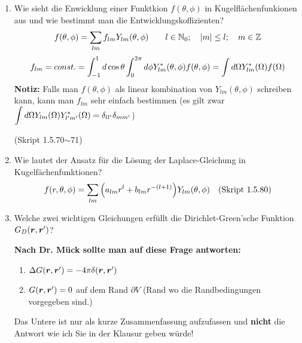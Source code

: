\begin{enumerate}
  \item Wie sieht die Enwicklung einer Funktkion $f(\theta,\phi)$ in %
        Kugelflächenfunkionen aus und wie bestimmt man die 
        Entwicklungskoffizienten?
        $$\displaystyle f(\theta, \phi)=\sum_{lm} f_{lm}Y_{lm}(\theta,\phi)
        \qquad l\in \mathbb{N}_0;\quad \abs{m}\le l; 
        \quad m\in\mathbb{Z}$$
        $$\displaystyle f_{lm}=const.
         =\int_{-1}^{1} d\cos\theta\int_0^{2\pi}d\phi 
         Y^*_{lm}(\theta,\phi)f(\theta,\phi)
         =\int d\Omega Y^*_{lm}(\Omega)f(\Omega)$$
         \textbf{Notiz:} Falls man $f(\theta,\phi)$ als linear kombination
         von $Y_{lm}(\theta,\phi)$ schreiben kann, kann man $f_{lm}$
         sehr einfach bestimmen (es gilt zwar $\displaystyle \int d\Omega 
         Y_{lm}(\Omega)Y_{l'm'}^*(\Omega)=\delta_{ll'}\delta_{mm'}$)
        \begin{center}
          (Skript 1.5.70$\sim$71)
        \end{center}

  \item Wie lautet der Ansatz für die Lösung der Laplace-Gleichung in %
        Kugelfächenfunktionen?\\
        $$f(r,\theta,\phi)=
        \sum_{lm}\qty(a_{lm}r^l+b_{lm}r^{-(l+1)})Y_{lm}(\theta,\phi)
        \quad\text{(Skript 1.5.80)}$$
         
  \item Welche zwei wichtigen Gleichungen erfüllt die %
    Dirichlet-Green'sche
        Funktion $G_D(\vb* r, \vb* r')$?

        \textbf{Nach Dr. Mück sollte man auf diese Frage antworten:}
        \begin{enumerate}
          \item $\Delta G(\vb* r, \vb* r')=-4\pi \delta(\vb* r, \vb*r')$
          \item $G(\vb* r, \vb* r')=0$ auf dem Rand $\partial V$ (Rand 
            wo die Randbedingungen vorgegeben sind.)
        \end{enumerate}

        Das Untere ist nur als kurze Zusammenfassung aufzufassen und  
        \textbf{nicht} die Antwort wie ich Sie in der Klausur geben würde!


\end{enumerate}
